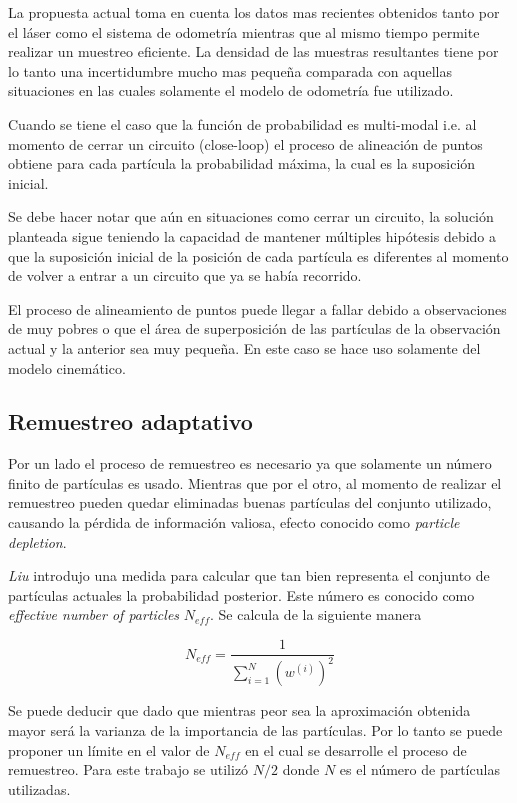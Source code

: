 \documentclass[10pt,a4paper]{article}
\begin{document}
La propuesta actual toma en cuenta los datos mas recientes obtenidos tanto por el láser como el sistema de odometría mientras que al mismo tiempo permite realizar un muestreo eficiente. La densidad de las muestras resultantes tiene por lo tanto una incertidumbre mucho mas pequeña comparada con aquellas situaciones en las cuales solamente el modelo de odometría fue utilizado.

Cuando se tiene el caso que la función de probabilidad es multi-modal i.e. al momento de cerrar un circuito (close-loop) el proceso de alineación de puntos obtiene para cada partícula la probabilidad máxima, la cual es la suposición inicial.

Se debe hacer notar que aún en situaciones como cerrar un circuito, la solución planteada sigue teniendo la capacidad de mantener múltiples hipótesis debido a que la suposición inicial de la posición de cada partícula es diferentes al momento de volver a entrar a un circuito que ya se había recorrido.

El proceso de alineamiento de puntos puede llegar a fallar debido a observaciones de muy pobres o que el área de superposición de las partículas de la observación actual y la anterior sea muy pequeña. En este caso se hace uso solamente del modelo cinemático.

\subsection{Remuestreo adaptativo}

Por un lado el proceso de remuestreo es necesario ya que solamente un número finito de partículas es usado. Mientras que por el otro, al momento de realizar el remuestreo pueden quedar eliminadas buenas partículas del conjunto utilizado, causando la pérdida de información valiosa, efecto conocido como \emph{particle depletion}.

\emph{Liu} introdujo una medida para calcular que tan bien representa el conjunto de partículas actuales la probabilidad posterior. Este número es conocido como \emph{effective number of particles} $ N_{eff} $. Se calcula de la siguiente manera

\begin{equation}
	N_{eff}	= \frac{1}
		{\sum^{N}_{i=1} (w^{(i)})^{2}}
\end{equation}

Se puede deducir que dado que mientras peor sea la aproximación obtenida mayor será la varianza de la importancia de las partículas. Por lo tanto se puede proponer un límite en el valor de $N_{eff}$ en el cual se desarrolle el proceso de remuestreo. Para este trabajo se utilizó $ N/2 $ donde $ N $ es el número de partículas utilizadas.








\end{document}
